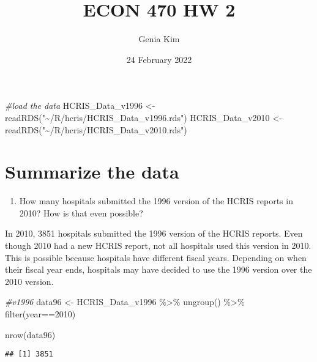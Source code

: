 \documentclass[
]{article}
\title{ECON 470 HW 2}
\author{Genia Kim}
\date{24 February 2022}
\newenvironment{Shaded}{\begin{snugshade}}{\end{snugshade}}
\newcommand{\CommentTok}[1]{\textcolor[rgb]{0.56,0.35,0.01}{\textit{#1}}}
\newcommand{\DecValTok}[1]{\textcolor[rgb]{0.00,0.00,0.81}{#1}}
\newcommand{\FunctionTok}[1]{\textcolor[rgb]{0.00,0.00,0.00}{#1}}
\newcommand{\NormalTok}[1]{#1}
\newcommand{\OtherTok}[1]{\textcolor[rgb]{0.56,0.35,0.01}{#1}}
\newcommand{\SpecialCharTok}[1]{\textcolor[rgb]{0.00,0.00,0.00}{#1}}
\newcommand{\StringTok}[1]{\textcolor[rgb]{0.31,0.60,0.02}{#1}}
\providecommand{\tightlist}{%
  \setlength{\itemsep}{0pt}\setlength{\parskip}{0pt}}
\begin{document}
\maketitle

\begin{Shaded}
\begin{Highlighting}[]
\CommentTok{\#load the data}
\NormalTok{HCRIS\_Data\_v1996 }\OtherTok{\textless{}{-}} \FunctionTok{readRDS}\NormalTok{(}\StringTok{"\textasciitilde{}/R/hcris/HCRIS\_Data\_v1996.rds"}\NormalTok{)}
\NormalTok{HCRIS\_Data\_v2010 }\OtherTok{\textless{}{-}} \FunctionTok{readRDS}\NormalTok{(}\StringTok{"\textasciitilde{}/R/hcris/HCRIS\_Data\_v2010.rds"}\NormalTok{)}
\end{Highlighting}
\end{Shaded}

\hypertarget{summarize-the-data}{%
\section{Summarize the data}\label{summarize-the-data}}

\begin{enumerate}
\def\labelenumi{\arabic{enumi}.}
\tightlist
\item
  How many hospitals submitted the 1996 version of the HCRIS reports in
  2010? How is that even possible?
\end{enumerate}

In 2010, 3851 hospitals submitted the 1996 version of the HCRIS reports.
Even though 2010 had a new HCRIS report, not all hospitals used this
version in 2010. This is possible because hospitals have different
fiscal years. Depending on when their fiscal year ends, hospitals may
have decided to use the 1996 version over the 2010 version.

\begin{Shaded}
\begin{Highlighting}[]
\CommentTok{\#v1996}
\NormalTok{data96 }\OtherTok{\textless{}{-}}\NormalTok{ HCRIS\_Data\_v1996 }\SpecialCharTok{\%\textgreater{}\%}
  \FunctionTok{ungroup}\NormalTok{() }\SpecialCharTok{\%\textgreater{}\%}
  \FunctionTok{filter}\NormalTok{(year}\SpecialCharTok{==}\DecValTok{2010}\NormalTok{) }

\FunctionTok{nrow}\NormalTok{(data96)}
\end{Highlighting}
\end{Shaded}

\begin{verbatim}
## [1] 3851
\end{verbatim}
\end{document}
